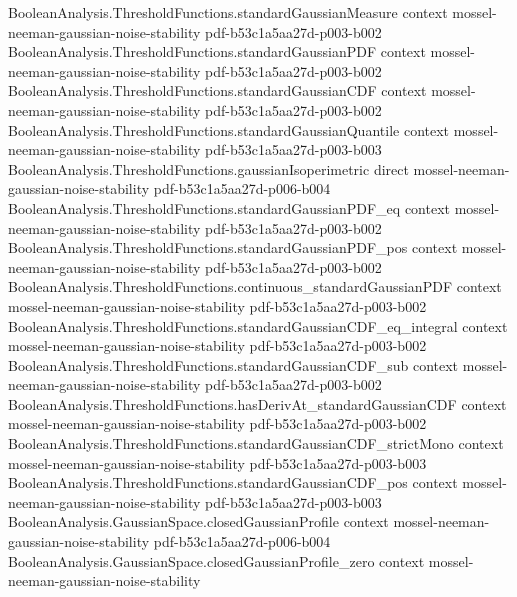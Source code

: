 \begin{lemma}
\proofstep
  {BooleanAnalysis.ThresholdFunctions.standardGaussianMeasure}
  {context}
  {mossel-neeman-gaussian-noise-stability}
  {pdf-b53c1a5aa27d-p003-b002}
\proofstep
  {BooleanAnalysis.ThresholdFunctions.standardGaussianPDF}
  {context}
  {mossel-neeman-gaussian-noise-stability}
  {pdf-b53c1a5aa27d-p003-b002}
\proofstep
  {BooleanAnalysis.ThresholdFunctions.standardGaussianCDF}
  {context}
  {mossel-neeman-gaussian-noise-stability}
  {pdf-b53c1a5aa27d-p003-b002}
\proofstep
  {BooleanAnalysis.ThresholdFunctions.standardGaussianQuantile}
  {context}
  {mossel-neeman-gaussian-noise-stability}
  {pdf-b53c1a5aa27d-p003-b003}
\proofstep
  {BooleanAnalysis.ThresholdFunctions.gaussianIsoperimetric}
  {direct}
  {mossel-neeman-gaussian-noise-stability}
  {pdf-b53c1a5aa27d-p006-b004}
\proofstep
  {BooleanAnalysis.ThresholdFunctions.standardGaussianPDF_eq}
  {context}
  {mossel-neeman-gaussian-noise-stability}
  {pdf-b53c1a5aa27d-p003-b002}
\proofstep
  {BooleanAnalysis.ThresholdFunctions.standardGaussianPDF_pos}
  {context}
  {mossel-neeman-gaussian-noise-stability}
  {pdf-b53c1a5aa27d-p003-b002}
\proofstep
  {BooleanAnalysis.ThresholdFunctions.continuous_standardGaussianPDF}
  {context}
  {mossel-neeman-gaussian-noise-stability}
  {pdf-b53c1a5aa27d-p003-b002}
\proofstep
  {BooleanAnalysis.ThresholdFunctions.standardGaussianCDF_eq_integral}
  {context}
  {mossel-neeman-gaussian-noise-stability}
  {pdf-b53c1a5aa27d-p003-b002}
\proofstep
  {BooleanAnalysis.ThresholdFunctions.standardGaussianCDF_sub}
  {context}
  {mossel-neeman-gaussian-noise-stability}
  {pdf-b53c1a5aa27d-p003-b002}
\proofstep
  {BooleanAnalysis.ThresholdFunctions.hasDerivAt_standardGaussianCDF}
  {context}
  {mossel-neeman-gaussian-noise-stability}
  {pdf-b53c1a5aa27d-p003-b002}
\proofstep
  {BooleanAnalysis.ThresholdFunctions.standardGaussianCDF_strictMono}
  {context}
  {mossel-neeman-gaussian-noise-stability}
  {pdf-b53c1a5aa27d-p003-b003}
\proofstep
  {BooleanAnalysis.ThresholdFunctions.standardGaussianCDF_pos}
  {context}
  {mossel-neeman-gaussian-noise-stability}
  {pdf-b53c1a5aa27d-p003-b003}
\proofstep
  {BooleanAnalysis.GaussianSpace.closedGaussianProfile}
  {context}
  {mossel-neeman-gaussian-noise-stability}
  {pdf-b53c1a5aa27d-p006-b004}
\proofstep
  {BooleanAnalysis.GaussianSpace.closedGaussianProfile_zero}
  {context}
  {mossel-neeman-gaussian-noise-stability}

\end{lemma}

